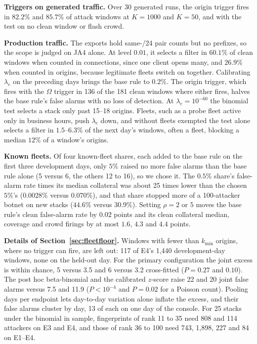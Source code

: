 \documentclass[conference,letterpaper,10pt]{IEEEtran}
\newcommand\1{\textit{(i)}}
\newcommand\2{\textit{(ii)}}
\newcommand\3{\textit{(iii)}}
\newcommand\4{\textit{(iv)}}
\newcommand\5{\textit{(v)}}
\newcommand\6{\textit{(vi)}}
\newcommand\7{\textit{(vii)}}
\newcommand\8{\textit{(viii)}}
\newcommand\9{\textit{(ix)}}
\begin{document}
\textbf{Triggers on generated traffic.} Over 30 generated runs, the origin trigger fires in $82.2\%$ and $85.7\%$ of attack windows at $K = 1000$ and $K = 50$, and with the test on no clean window or flash crowd.

\textbf{Production traffic.} The exports hold same-/24 pair counts but no prefixes, so the scope is judged on JA4 alone. At level $0.01$, it selects a filter in $60.1\%$ of clean windows when counted in connections, since one client opens many, and $26.9\%$ when counted in origins, because legitimate fleets switch on together. Calibrating $\lambda_e$ on the preceding days brings the base rule to $0.2\%$. The origin trigger, which fires with the $\Omega$ trigger in 136 of the 181 clean windows where either fires, halves the base rule's false alarms with no loss of detection. At $\lambda_e = 10^{-60}$ the binomial test selects a stack only past 15--18 origins. Fleets, such as a probe fleet active only in business hours, push $\lambda_e$ down, and without fleets exempted the test alone selects a filter in $1.5$--$6.3\%$ of the next day's windows, often a fleet, blocking a median $12\%$ of a window's origins.

\textbf{Known fleets.} Of four known-fleet shares, each added to the base rule on the first three development days, only $5\%$ raised no more false alarms than the base rule alone (5 versus 6, the others 12 to 16), so we chose it. The $0.5\%$ share's false-alarm rate times its median collateral was about 25 times lower than the chosen $5\%$'s ($0.0028\%$ versus $0.070\%$), and that share stopped more of a 100-attacker botnet on new stacks ($44.6\%$ versus $30.9\%$). Setting $\rho = 2$ or $5$ moves the base rule's clean false-alarm rate by $0.02$ points and its clean collateral median, coverage and crowd firings by at most $1.6$, $4.3$ and $4.4$ points.

\textbf{Details of Section~\ref{sec:fleetfloor}.} Windows with fewer than $k_{\min}$ origins, where no trigger can fire, are left out: 117 of E4's 1,440 development-day windows, none on the held-out day. For the primary configuration the joint excess is within chance, 5 versus 3.5 and 6 versus 3.2 cross-fitted ($P = 0.27$ and $0.10$). The post hoc beta-binomial and the calibrated $z$-score raise 22 and 20 joint false alarms versus 7.5 and 11.9 ($P < 10^{-4}$ and $P = 0.02$ for a Poisson count). Pooling days per endpoint lets day-to-day variation alone inflate the excess, and their false alarms cluster by day, 13 of each on one day of the console. For 25 stacks under the binomial in sample, fingerprints of rank 11 to 35 need 808 and 114 attackers on E3 and E4, and those of rank 36 to 100 need 743, 1,898, 227 and 84 on E1--E4.
\end{document}
